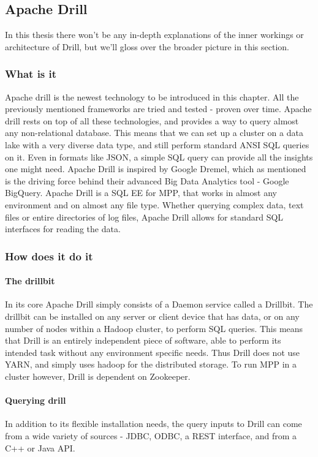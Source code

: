 \documentclass[a4paper,english]{report}
\begin{document}
		\subsection{Apache Drill}
		In this thesis there won't be any in-depth explanations of the inner workings or architecture of Drill, but we'll gloss over the broader picture in this section.
		\subsubsection{What is it}
		Apache drill is the newest technology to be introduced in this chapter. All the previously mentioned frameworks are tried and tested - proven over time. Apache drill rests on top of all these technologies, and provides a way to query almost any non-relational database. This means that we can set up a cluster on a data lake with a very diverse data type, and still perform standard ANSI SQL queries on it. Even in formats like JSON, a simple SQL query can provide all the insights one might need. Apache Drill is inspired by Google Dremel, which as mentioned is the driving force behind their advanced Big Data Analytics tool - Google BigQuery. Apache Drill is a SQL EE for MPP, that works in almost any environment and on almost any file type. Whether querying complex data, text files or entire directories of log files, Apache Drill allows for standard SQL interfaces for reading the data.
		\subsubsection{How does it do it}
		\paragraph{The drillbit}
		In its core Apache Drill simply consists of a Daemon service called a Drillbit. The drillbit can be installed on any server or client device that has data, or on any number of nodes within a Hadoop cluster, to perform SQL queries. This means that Drill is an entirely independent piece of software, able to perform its intended task without any environment specific needs. Thus Drill does not use YARN, and simply uses hadoop for the distributed storage. To run MPP in a cluster however, Drill is dependent on Zookeeper.
		\paragraph{Querying drill} In addition to its flexible installation needs, the query inputs to Drill can come from a wide variety of sources - JDBC, ODBC, a REST interface, and from a C++ or Java API.
\end{document}
